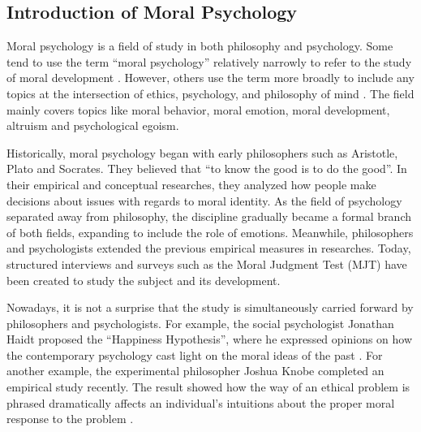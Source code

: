 \subsection{Introduction of Moral Psychology} %
\label{sub:introduction_of_moral_psychology}
\begin{text}

Moral psychology is a field of study in both philosophy and psychology. Some tend to use the term ``moral psychology'' relatively narrowly to refer to the study of moral development \citep{lapsley1996moral}. However, others use the term more broadly to include any topics at the intersection of ethics, psychology, and philosophy of mind \citep{doris2008moral}. The field mainly covers topics like moral behavior, moral emotion, moral development, altruism and psychological egoism.

Historically, moral psychology began with early philosophers such as Aristotle, Plato and Socrates. They believed that ``to know the good is to do the good''. In their empirical and conceptual researches, they analyzed how people make decisions about issues with regards to moral identity. As the field of psychology separated away from philosophy, the discipline gradually became a formal branch of both fields, expanding to include the role of emotions. Meanwhile, philosophers and psychologists extended the previous empirical measures in researches. Today, structured interviews and surveys such as the Moral Judgment Test (MJT) have been created to study the subject and its development.

Nowadays, it is not a surprise that the study is simultaneously carried forward by philosophers and psychologists. For example, the social psychologist Jonathan Haidt proposed the ``Happiness Hypothesis'', where he expressed opinions on how the contemporary psychology cast light on the moral ideas of the past \citep{ wiki:mp}. For another example, the experimental philosopher Joshua Knobe completed an empirical study recently. The result showed how the way of an ethical problem is phrased dramatically affects an individual's intuitions about the proper moral response to the problem \citep{ wiki:mp}.

\end{text}
